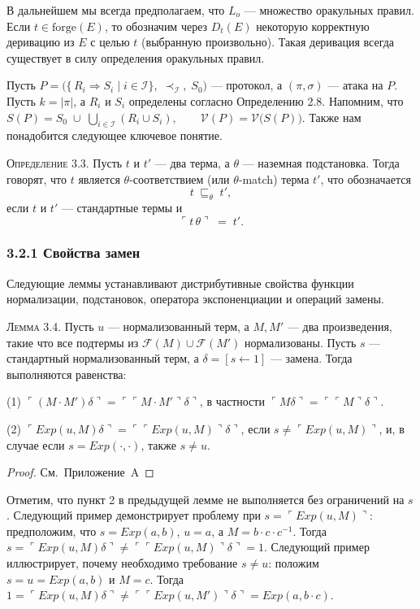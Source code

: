В дальнейшем мы всегда предполагаем, что \(L_{o}\) — множество оракульных правил. Если \(t\in\mathrm{forge}(E)\), то обозначим через \(D_{t}(E)\) некоторую корректную деривацию из \(E\) с целью \(t\) (выбранную произвольно). Такая деривация всегда существует в силу определения оракульных правил.

Пусть $P=\bigl(\{\,R_i\Rightarrow S_i\mid i\in\mathcal{I}\},\;\prec_{\mathcal{I}},\;S_0\bigr)$ — протокол, а \((\pi,\sigma)\) — атака на \(P\). Пусть \(k=|\pi|\), а \(R_i\) и \(S_i\) определены согласно Определению 2.8. Напомним, что
$S(P)=S_0\;\cup\;\bigcup_{i\in\mathcal{I}}(R_i\cup S_i), \qquad \mathcal{V}(P)=\mathcal{V}\bigl(S(P)\bigr)$.
Также нам понадобится следующее ключевое понятие.

\textsc{Определение 3.3.} Пусть \(t\) и \(t'\) — два терма, а \(\theta\) — наземная подстановка. Тогда говорят, что \(t\) является \(\theta\)\nobreakdash‑соответствием (или \(\theta\)\nobreakdash‑match) терма \(t'\), что обозначается
\[
t \;\sqsubseteq_{\theta}\; t',
\]
если \(t\) и \(t'\) — стандартные термы и
\[
\ulcorner t\,\theta \urcorner\;=\; t'.
\]

\subsubsection*{3.2.1 Свойства замен}

Следующие леммы устанавливают дистрибутивные свойства функции нормализации, подстановок, оператора экспоненциации и операций замены.

\textsc{Лемма 3.4.} Пусть \(u\) — нормализованный терм, а \(M, M'\) — два произведения, такие что все подтермы из \(\mathcal{F}(M)\cup \mathcal{F}(M')\) нормализованы. Пусть \(s\) — стандартный нормализованный терм, а \(\delta=[s\leftarrow 1]\) — замена. Тогда выполняются равенства:

(1)\quad 
\(\ulcorner (M\cdot M') \delta \urcorner
   =\ulcorner\ulcorner M\cdot M'\urcorner\delta\urcorner\),
в частности 
\(\ulcorner M\delta\urcorner=\ulcorner\ulcorner M\urcorner{\delta}\urcorner\).

(2)\quad 
\(\ulcorner Exp(u,M)\delta\urcorner
   =\ulcorner\ulcorner Exp(u,M)\urcorner\delta\urcorner\),
если \(s\neq\ulcorner Exp(u,M)\urcorner\),
и, в случае если \(s=Exp(\cdot,\cdot)\), также \(s\neq u\).

\begin{proof}
См.~Приложение~A\qedhere
\end{proof}

\medskip
Отметим, что пункт 2 в предыдущей лемме не выполняется без ограничений на $s$.
Следующий пример демонстрирует проблему при
$s=\ulcorner Exp(u,M)\urcorner$:
предположим, что $s=Exp(a,b)$, $u=a$, а
$M=b\!\cdot\!c\!\cdot\!c^{-1}$.
Тогда
$s=\ulcorner Exp(u,M)\delta\urcorner
\neq
\ulcorner\ulcorner Exp(u,M)\urcorner\delta\urcorner=1$.  
Следующий пример иллюстрирует, почему необходимо требование $s\neq u$:
положим $s=u=Exp(a,b)$ и $M=c$.
Тогда
$1=\ulcorner Exp(u,M)\delta\urcorner
\neq
\ulcorner\ulcorner Exp(u,M')\urcorner\delta\urcorner
=Exp(a,b\!\cdot\!c)$.

